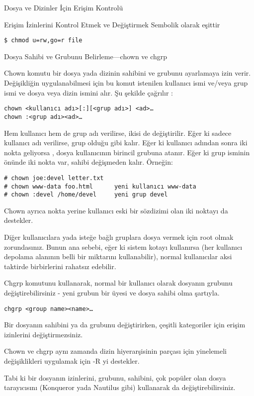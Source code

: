 \begin{section}{Dosya ve Dizinler İçin Erişim Kontrolü}
\begin{subsection}{Erişim İzinlerini Kontrol Etmek ve Değiştirmek}
Sembolik olarak eşittir
\begin{verbatim}
$ chmod u=rw,go=r file
\end{verbatim}
\end{subsection}
\begin{subsection}{Dosya Sahibi ve Grubunu Belirleme—chown ve chgrp}

Chown komutu bir dosya yada dizinin sahibini ve grubunu ayarlamaya izin verir. Değişikliğin uygulanabilmesi için bu komut istenilen kullanıcı ismi ve/veya grup ismi ve dosya veya dizin ismini alır. Şu şekilde çağrılır :
\begin{verbatim}
chown <kullanıcı adı>[:][<grup adı>] <ad>…
chown :<grup adı><ad>…
\end{verbatim}

Hem kullanıcı hem de grup adı verilirse, ikisi de değiştirilir. Eğer ki sadece kullanıcı adı verilirse, grup olduğu gibi kalır. Eğer ki kullanıcı adından sonra iki nokta geliyorsa , dosya kullanıcının birincil grubuna atanır. Eğer ki grup isminin önünde iki nokta var, sahibi değişmeden kalır. Örneğin:
\begin{verbatim}
# chown joe:devel letter.txt
# chown www-data foo.html      yeni kullanıcı www-data
# chown :devel /home/devel     yeni grup devel
\end{verbatim}

Chown ayrıca nokta yerine kullanıcı eski bir sözdizimi olan iki noktayı da destekler.

Diğer kullanıcılara yada isteğe bağlı gruplara dosya vermek için root olmak zorundasınız. Bunun ana sebebi, eğer ki sistem kotayı kullanırsa (her kullanıcı depolama alanının belli bir miktarını kullanabilir), normal kullanıcılar aksi taktirde birbirlerini rahatsız edebilir.

Chgrp komutunu kullanarak, normal bir kullanıcı olarak dosyanın grubunu değiştirebilirsiniz - yeni grubun bir üyesi ve dosya sahibi olma şartıyla.
\begin{verbatim}
chgrp <group name><name>…
\end{verbatim}

Bir dosyanın sahibini ya da grubunu değiştirirken, çeşitli kategoriler için erişim izinlerini değiştirmezsiniz.

Chown ve chgrp aynı zamanda dizin hiyerarşisinin parçası için yinelemeli değişiklikleri uygulamak için -R yi destekler.

Tabi ki bir dosyanın izinlerini, grubunu, sahibini, çok popüler olan dosya tarayıcısını (Konqueror yada Nautilus gibi) kullanarak da değiştirebilirsiniz.


\end{subsection}
\end{section}
